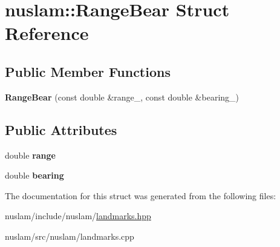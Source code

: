 \hypertarget{structnuslam_1_1RangeBear}{}\section{nuslam\+:\+:Range\+Bear Struct Reference}
\label{structnuslam_1_1RangeBear}
\subsection*{Public Member Functions}
\begin{DoxyCompactItemize}
\item 
\mbox{\label{structnuslam_1_1RangeBear_acafea61691e1944e68f033ff09d02ca0}} 
{\bfseries Range\+Bear} (const double \&range\+\_\+, const double \&bearing\+\_\+)
\end{DoxyCompactItemize}
\subsection*{Public Attributes}
\begin{DoxyCompactItemize}
\item 
\mbox{\label{structnuslam_1_1RangeBear_a1c6950401d08691b6cf6113bf3d35b25}} 
double {\bfseries range}
\item 
\mbox{\label{structnuslam_1_1RangeBear_a354541685ae24f2ed2e3503a7a96d5d6}} 
double {\bfseries bearing}
\end{DoxyCompactItemize}


The documentation for this struct was generated from the following files\+:\begin{DoxyCompactItemize}
\item 
nuslam/include/nuslam/\hyperlink{landmarks_8hpp}{landmarks.\+hpp}\item 
nuslam/src/nuslam/landmarks.\+cpp\end{DoxyCompactItemize}
